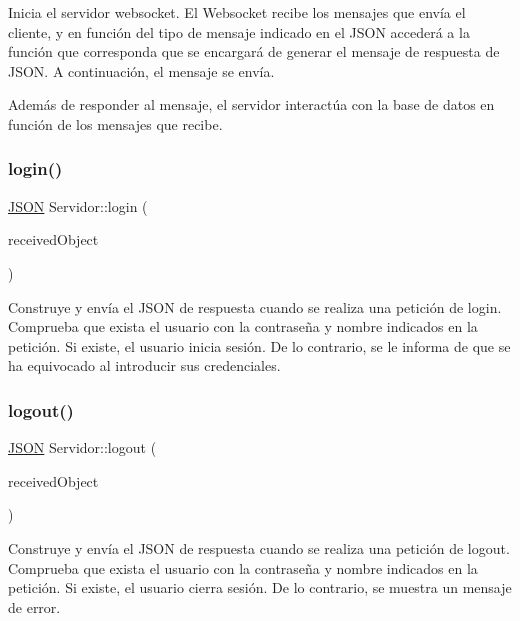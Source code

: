 Inicia el servidor websocket. El Websocket recibe los mensajes que envía el cliente, y en función del tipo de mensaje indicado en el J\+S\+ON accederá a la función que corresponda que se encargará de generar el mensaje de respuesta de J\+S\+ON. A continuación, el mensaje se envía.

Además de responder al mensaje, el servidor interactúa con la base de datos en función de los mensajes que recibe. \mbox{\label{classServidor_afa99d1a7d42e43c66c066aa8d4622fbf}} 
\subsubsection{\texorpdfstring{login()}{login()}}
{\footnotesize\ttfamily \mbox{\hyperlink{classnlohmann_1_1basic__json}{J\+S\+ON}} Servidor\+::login (\begin{DoxyParamCaption}\item[{\mbox{\hyperlink{classnlohmann_1_1basic__json}{J\+S\+ON}}}]{received\+Object }\end{DoxyParamCaption})}

Construye y envía el J\+S\+ON de respuesta cuando se realiza una petición de login. Comprueba que exista el usuario con la contraseña y nombre indicados en la petición. Si existe, el usuario inicia sesión. De lo contrario, se le informa de que se ha equivocado al introducir sus credenciales. \mbox{\label{classServidor_a612baa3e7a827632a48aacdc024e2a20}} 
\subsubsection{\texorpdfstring{logout()}{logout()}}
{\footnotesize\ttfamily \mbox{\hyperlink{classnlohmann_1_1basic__json}{J\+S\+ON}} Servidor\+::logout (\begin{DoxyParamCaption}\item[{\mbox{\hyperlink{classnlohmann_1_1basic__json}{J\+S\+ON}}}]{received\+Object }\end{DoxyParamCaption})}

Construye y envía el J\+S\+ON de respuesta cuando se realiza una petición de logout. Comprueba que exista el usuario con la contraseña y nombre indicados en la petición. Si existe, el usuario cierra sesión. De lo contrario, se muestra un mensaje de error. \mbox{\label{classServidor_adc19f6be9f624330db206a9d98c981a5}} 

